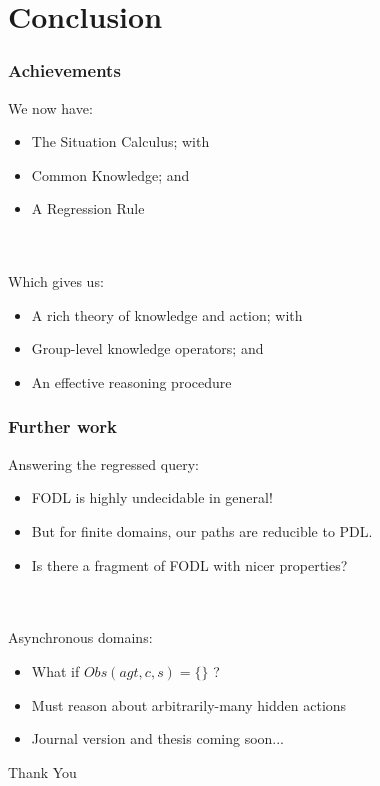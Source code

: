 \documentclass[compress]{beamer}
\begin{document}
\section{Conclusion}

\begin{frame}
\frametitle{Achievements}
We now have:
\begin{itemize}
\item The Situation Calculus; with
\item Common Knowledge; and
\item A Regression Rule
\end{itemize}
\ \\
\ \\
\pause
Which gives us:
\begin{itemize}
\item A rich theory of knowledge and action; with
\item Group-level knowledge operators; and
\item An effective reasoning procedure
\end{itemize}
\end{frame}


\begin{frame}
\frametitle{Further work}
Answering the regressed query:
\begin{itemize}
\item FODL is highly undecidable in general!
\item But for finite domains, our paths are reducible to PDL.
\item Is there a fragment of FODL with nicer properties?
\end{itemize}
\ \\
\ \\
Asynchronous domains:
\begin{itemize}
\item What if $Obs(agt,c,s) = \{\}$ ?
\item Must reason about arbitrarily-many hidden actions
\pause
\item Journal version and thesis coming soon...
\end{itemize}
\end{frame}

\begin{frame}
\centering \large Thank You\\
\end{frame}
\end{document}
